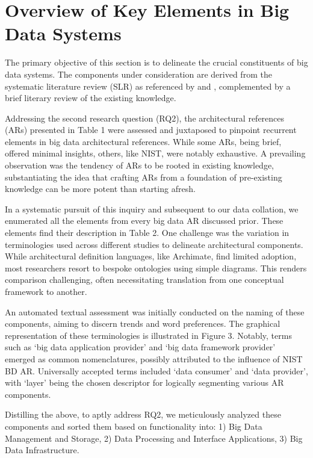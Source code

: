\documentclass[conference]{IEEEtran}
\begin{document}
\section{Overview of Key Elements in Big Data Systems}

The primary objective of this section is to delineate the crucial constituents of big data systems. The components under consideration are derived from the systematic literature review (SLR) as referenced by \cite{b1} and \cite{b2}, complemented by a brief literary review of the existing knowledge.

Addressing the second research question (RQ2), the architectural references (ARs) presented in Table 1 were assessed and juxtaposed to pinpoint recurrent elements in big data architectural references. While some ARs, being brief, offered minimal insights, others, like NIST, were notably exhaustive. A prevailing observation was the tendency of ARs to be rooted in existing knowledge, substantiating the idea that crafting ARs from a foundation of pre-existing knowledge can be more potent than starting afresh.

In a systematic pursuit of this inquiry and subsequent to our data collation, we enumerated all the elements from every big data AR discussed prior. These elements find their description in Table 2. One challenge was the variation in terminologies used across different studies to delineate architectural components. While architectural definition languages, like Archimate, find limited adoption, most researchers resort to bespoke ontologies using simple diagrams. This renders comparison challenging, often necessitating translation from one conceptual framework to another.

An automated textual assessment was initially conducted on the naming of these components, aiming to discern trends and word preferences. The graphical representation of these terminologies is illustrated in Figure 3. Notably, terms such as ‘big data application provider’ and ‘big data framework provider’ emerged as common nomenclatures, possibly attributed to the influence of NIST BD AR. Universally accepted terms included ‘data consumer’ and ‘data provider’, with ‘layer’ being the chosen descriptor for logically segmenting various AR components.

Distilling the above, to aptly address RQ2, we meticulously analyzed these components and sorted them based on functionality into: 1) Big Data Management and Storage, 2) Data Processing and Interface Applications, 3) Big Data Infrastructure.
\end{document}
